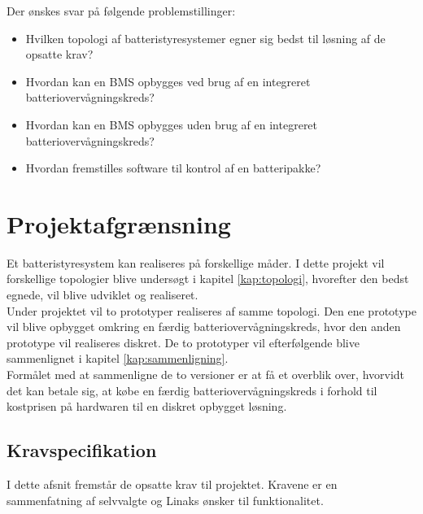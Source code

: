 Der ønskes svar på følgende problemstillinger: 

\begin{itemize}[noitemsep]
	\item Hvilken topologi af batteristyresystemer egner sig bedst til løsning af de opsatte krav?
	\item Hvordan kan en BMS opbygges ved brug af en integreret batteriovervågningskreds?
	\item Hvordan kan en BMS opbygges uden brug af en integreret batteriovervågningskreds? 
	\item Hvordan fremstilles software til kontrol af en batteripakke?
\end{itemize}

\section{Projektafgrænsning}
Et batteristyresystem kan realiseres på forskellige måder. I dette projekt vil forskellige topologier blive undersøgt i kapitel \ref{kap:topologi}, hvorefter den bedst egnede, vil blive udviklet og realiseret. 
\\

Under projektet vil to prototyper realiseres af samme topologi. Den ene prototype vil blive opbygget omkring en færdig batteriovervågningskreds, hvor den anden prototype vil realiseres diskret. De to prototyper vil efterfølgende blive sammenlignet i kapitel \ref{kap:sammenligning}.
\\

Formålet med at sammenligne de to versioner er at få et overblik over, hvorvidt det kan betale sig, at købe en færdig batteriovervågningskreds i forhold til kostprisen på hardwaren til en diskret opbygget løsning.


\subsection{Kravspecifikation} \label{afs:kravspecifikation}
I dette afsnit fremstår de opsatte krav til projektet. Kravene er en sammenfatning af selvvalgte og Linaks ønsker til funktionalitet.

